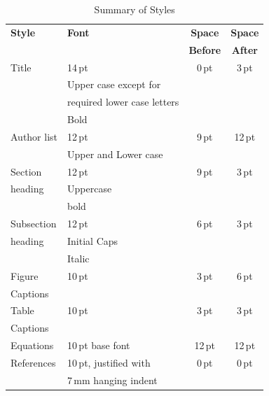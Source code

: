 \documentclass{JAC2003}
\begin{document}
\begin{table}
    \setlength\tabcolsep{4pt}
    \caption{Summary of Styles}
    \label{style-tab}
    \begin{tabular}{llcc}
        \toprule
        \textbf{Style} & \textbf{Font}               & \textbf{Space}  & \textbf{Space} \\
                       &                             & \textbf{Before} & \textbf{After} \\ 
        \midrule
         Title         & 14\,pt                      & 0\,pt           & 3\,pt  \\
                       & Upper case except for       &                 &      \\
                       & required lower case letters &                 &      \\   %
                       & Bold                        &                 &      \\ 
         \midrule
          Author list  & 12\,pt                      & 9\,pt           & 12\,pt \\
                       & Upper and Lower case        &                 &      \\ 
         \midrule
         Section       & 12\,pt                      & 9\,pt           & 3\,pt  \\
         heading       & Uppercase                   &                 &      \\
                       & bold                        &                 &      \\ 
        \midrule
         Subsection    & 12\,pt                      & 6\,pt           & 3\,pt  \\
         heading       & Initial Caps                &                 &      \\
                       & Italic                      &                 &      \\ 
        \midrule
         Figure        & 10\,pt                      & 3\,pt           & 6\,pt  \\
         Captions      &                             &                 &      \\
        \midrule
         Table         & 10\,pt                      & 3\,pt           & 3\,pt  \\
         Captions      &                             &                 &      \\
        \midrule
         Equations     & 10\,pt base font            & 12\,pt          & 12\,pt \\
        \midrule
         References    & 10\,pt, justified with      & 0\,pt           & 0\,pt  \\
                       & 7\,mm hanging indent          &                 &      \\
        \bottomrule
    \end{tabular}
\end{table}
\end{document}
